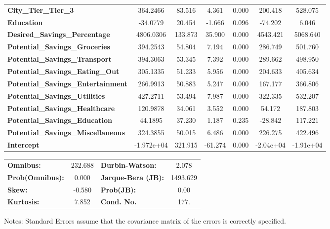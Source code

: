 \documentclass[12pt]{article}
\begin{document}
\begin{center}
\begin{tabular}{lcccccc}
    \textbf{City\_Tier\_Tier\_3}               &     364.2466  &       83.516     &     4.361  &         0.000        &      200.418    &      528.075     \\
    \textbf{Education}                         &     -34.0779  &       20.454     &    -1.666  &         0.096        &      -74.202    &        6.046     \\
    \textbf{Desired\_Savings\_Percentage}      &    4806.0306  &      133.873     &    35.900  &         0.000        &     4543.421    &     5068.640     \\
    \textbf{Potential\_Savings\_Groceries}     &     394.2543  &       54.804     &     7.194  &         0.000        &      286.749    &      501.760     \\
    \textbf{Potential\_Savings\_Transport}     &     394.3063  &       53.345     &     7.392  &         0.000        &      289.662    &      498.950     \\
    \textbf{Potential\_Savings\_Eating\_Out}   &     305.1335  &       51.233     &     5.956  &         0.000        &      204.633    &      405.634     \\
    \textbf{Potential\_Savings\_Entertainment} &     266.9913  &       50.883     &     5.247  &         0.000        &      167.177    &      366.806     \\
    \textbf{Potential\_Savings\_Utilities}     &     427.2711  &       53.494     &     7.987  &         0.000        &      322.335    &      532.207     \\
    \textbf{Potential\_Savings\_Healthcare}    &     120.9878  &       34.061     &     3.552  &         0.000        &       54.172    &      187.803     \\
    \textbf{Potential\_Savings\_Education}     &      44.1895  &       37.230     &     1.187  &         0.235        &      -28.842    &      117.221     \\
    \textbf{Potential\_Savings\_Miscellaneous} &     324.3855  &       50.015     &     6.486  &         0.000        &      226.275    &      422.496     \\
    \textbf{Intercept}                         &   -1.972e+04  &      321.915     &   -61.274  &         0.000        &    -2.04e+04    &    -1.91e+04     \\
    \bottomrule
    \end{tabular}
    \begin{tabular}{lclc}
    \textbf{Omnibus:}       & 232.688 & \textbf{  Durbin-Watson:     } &    2.078  \\
    \textbf{Prob(Omnibus):} &   0.000 & \textbf{  Jarque-Bera (JB):  } & 1493.629  \\
    \textbf{Skew:}          &  -0.580 & \textbf{  Prob(JB):          } &     0.00  \\
    \textbf{Kurtosis:}      &   7.852 & \textbf{  Cond. No.          } &     177.  \\
    \bottomrule
    \end{tabular}
    \end{center}
    
    Notes: \newline
     [1] Standard Errors assume that the covariance matrix of the errors is correctly specified.
\end{document}
